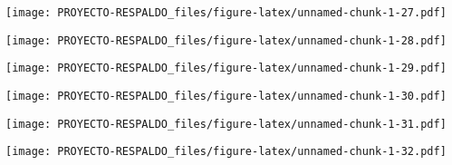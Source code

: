 \documentclass[
]{article}
\newenvironment{Shaded}{\begin{snugshade}}{\end{snugshade}}
\newcommand{\DataTypeTok}[1]{\textcolor[rgb]{0.13,0.29,0.53}{#1}}
\newcommand{\KeywordTok}[1]{\textcolor[rgb]{0.13,0.29,0.53}{\textbf{#1}}}
\newcommand{\NormalTok}[1]{#1}
\newcommand{\OperatorTok}[1]{\textcolor[rgb]{0.81,0.36,0.00}{\textbf{#1}}}
\newcommand{\StringTok}[1]{\textcolor[rgb]{0.31,0.60,0.02}{#1}}
\begin{document}
\texttt{[image: PROYECTO-RESPALDO\_files/figure-latex/unnamed-chunk-1-27.pdf]}

\begin{Shaded}
\end{Shaded}

\texttt{[image: PROYECTO-RESPALDO\_files/figure-latex/unnamed-chunk-1-28.pdf]}

\begin{Shaded}
\end{Shaded}

\texttt{[image: PROYECTO-RESPALDO\_files/figure-latex/unnamed-chunk-1-29.pdf]}

\begin{Shaded}
\end{Shaded}

\texttt{[image: PROYECTO-RESPALDO\_files/figure-latex/unnamed-chunk-1-30.pdf]}

\begin{Shaded}
\end{Shaded}

\texttt{[image: PROYECTO-RESPALDO\_files/figure-latex/unnamed-chunk-1-31.pdf]}

\begin{Shaded}
\end{Shaded}

\texttt{[image: PROYECTO-RESPALDO\_files/figure-latex/unnamed-chunk-1-32.pdf]}

\begin{Shaded}
\end{Shaded}
\end{document}

